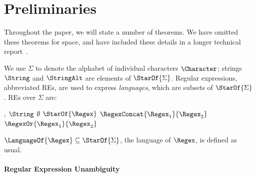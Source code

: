\documentclass[acmsmall,screen]{acmart}
\begin{document}

\section{Preliminaries}
\label{preliminaries}


Throughout the paper, we will state a number of theorems.  We have omitted these
theorems for space, and have included these details in a longer technical
report~\cite{extended-version}.


We use $\Sigma$ to denote the alphabet of individual characters $\Character$;
strings $\String$ and $\StringAlt$ are
elements of $\StarOf{\Sigma}$.  Regular expressions, abbreviated REs, are
used to express \emph{languages}, which are subsets of $\StarOf{\Sigma}$.
REs over $\Sigma$ are:
\begin{center}
  \Regex{},\RegexAlt{} \hspace{1em} \GEq{}
  \hspace{1em} $\String$ \hspace{1em} 
  \GBar{} \hspace{1em} $\emptyset$ \hspace{1em} 
  \GBar{} \hspace{1em} $\StarOf{\Regex}$ \hspace{1em} 
  \GBar{} \hspace{1em} $\RegexConcat{\Regex_1}{\Regex_2}$ \hspace{1em} 
  \GBar{} \hspace{1em} $\RegexOr{\Regex_1}{\Regex_2}$
\end{center}
$\LanguageOf{\Regex}\subseteq \StarOf{\Sigma}$, the language of $\Regex$, is
defined as usual. 

\paragraph*{\iffull Regular Expression \fi Unambiguity}
\end{document}
